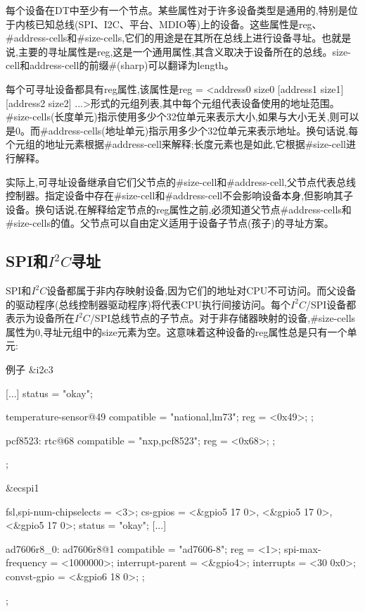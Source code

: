 \documentclass[lang=cn,newtx,10pt,scheme=chinese]{elegantbook}
\begin{document}
每个设备在DT中至少有一个节点。某些属性对于许多设备类型是通用的,特别是位于内核已知总线(SPI、I2C、平台、MDIO等)上的设备。这些属性是reg、\#address-cells和\#size-cells,它们的用途是在其所在总线上进行设备寻址。也就是说,主要的寻址属性是reg,这是一个通用属性,其含义取决于设备所在的总线。size-cell和address-cell的前缀\#(sharp)可以翻译为length。

每个可寻址设备都具有reg属性,该属性是reg = <address0 size0 [address1 size1] [address2 size2] ...>形式的元组列表,其中每个元组代表设备使用的地址范围。\#size-cells(长度单元)指示使用多少个32位单元来表示大小,如果与大小无关,则可以是0。而\#address-cells(地址单元)指示用多少个32位单元来表示地址。换句话说,每个元组的地址元素根据\#address-cell来解释;长度元素也是如此,它根据\#size-cell进行解释。

实际上,可寻址设备继承自它们父节点的\#size-cell和\#address-cell,父节点代表总线控制器。指定设备中存在\#size-cell和\#address-cell不会影响设备本身,但影响其子设备。换句话说,在解释给定节点的reg属性之前,必须知道父节点\#address-cells和\#size-cells的值。父节点可以自由定义适用于设备子节点(孩子)的寻址方案。

\subsection{SPI和\texorpdfstring{$I^2C$寻址}{I2C寻址}}

SPI和$I^2C$设备都属于非内存映射设备,因为它们的地址对CPU不可访问。而父设备的驱动程序(总线控制器驱动程序)将代表CPU执行间接访问。每个$I^2C$/SPI设备都表示为设备所在$I^2C$/SPI总线节点的子节点。对于非存储器映射的设备,\#size-cells属性为0,寻址元组中的size元素为空。这意味着这种设备的reg属性总是只有一个单元:

\begin{mycode}{例子}
&i2c3 {
    [...]
    status = "okay";

    temperature-sensor@49 {
        compatible = "national,lm73";
        reg = <0x49>;
    };

    pcf8523: rtc@68 {
        compatible = "nxp,pcf8523";
        reg = <0x68>;
    };
};

&ecspi1 {
    fsl,spi-num-chipselects = <3>;
    cs-gpios = <&gpio5 17 0>, <&gpio5 17 0>, <&gpio5 17 0>;
    status = "okay";
    [...]

    ad7606r8_0: ad7606r8@1 {
        compatible = "ad7606-8";
        reg = <1>;
        spi-max-frequency = <1000000>;
        interrupt-parent = <&gpio4>;
        interrupts = <30 0x0>;
        convst-gpio = <&gpio6 18 0>;
    };
};
\end{mycode}
\end{document}
